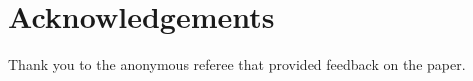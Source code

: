 \section*{Acknowledgements}

Thank you to the anonymous referee that provided feedback on the paper.